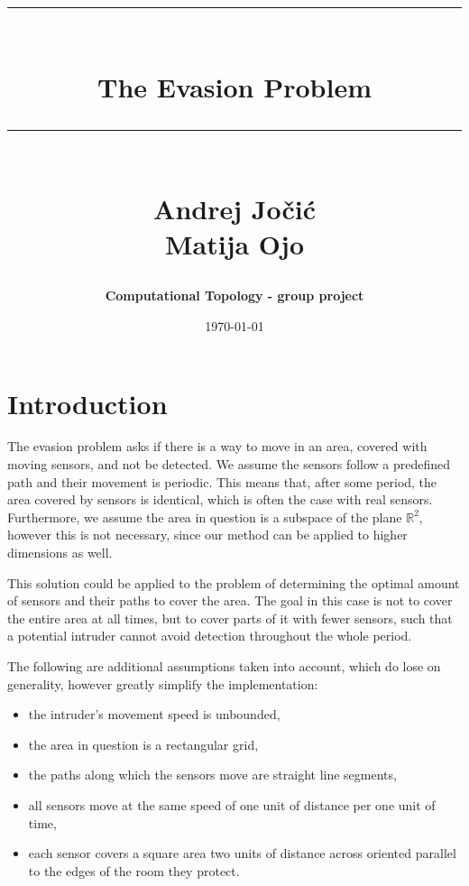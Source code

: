 \documentclass{article}
\makeatletter
\newcommand{\HRule}[1]{\rule{\linewidth}{#1}}
\renewcommand{\maketitle}{%
  \begin{center}
    \vspace*{3cm} %
    {\LARGE\@author\par}
    \vspace{1cm} %
    {\Huge\bfseries\@title\par}
    \vspace{2cm} %
    {\Large\@date\par}
  \end{center}
}
\makeatother
\begin{document}
\title{ \normalsize \textsc{}
\\ [0.5cm]
\HRule{1.0pt} \\
\Huge \textbf{The Evasion Problem}
\HRule{1.0pt}
\\ [1.5cm]
\LARGE{Andrej Jočić \\ Matija Ojo}
}
\author{\textbf{Computational Topology - group project}}
\date{\today}

\maketitle

\newpage


\section{Introduction}

The evasion problem asks if there is a way to move in an area, covered with moving sensors, and not be detected.
We assume the sensors follow a predefined path and their movement is periodic.
This means that, after some period, the area covered by sensors is identical, which is often the case with real sensors.
Furthermore, we assume the area in question is a subspace of the plane $ \mathbb{R}^2 $, however this is not necessary, since our method can be applied to higher dimensions as well.

This solution could be applied to the problem of determining the optimal amount of sensors and their paths to cover the area.
The goal in this case is not to cover the entire area at all times, but to cover parts of it with fewer sensors, such that a potential intruder cannot avoid detection throughout the whole period.

The following are additional assumptions taken into account, which do lose on generality, however greatly simplify the implementation:
\begin{itemize}
  \item the intruder's movement speed is unbounded,
  \item the area in question is a rectangular grid,
  \item the paths along which the sensors move are straight line segments,
  \item all sensors move at the same speed of one unit of distance per one unit of time,
  \item each sensor covers a square area two units of distance across oriented parallel to the edges of the room they protect.
\end{itemize}
\end{document}
